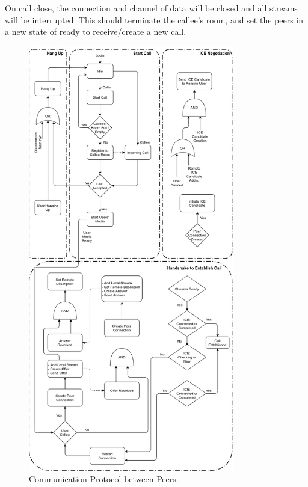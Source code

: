 On call close, the connection and channel of data will be closed and all streams will be interrupted. This should terminate the callee’s room, and set the peers in a new state of ready to receive/create a new call.
\begin{figure}[h!]
    \caption{Communication Protocol between Peers.}
    \label{image:commsProtocol}
    \centering
    \includegraphics[width=0.8\textwidth]{images/CommunicationProtocol.png}
\end{figure}

